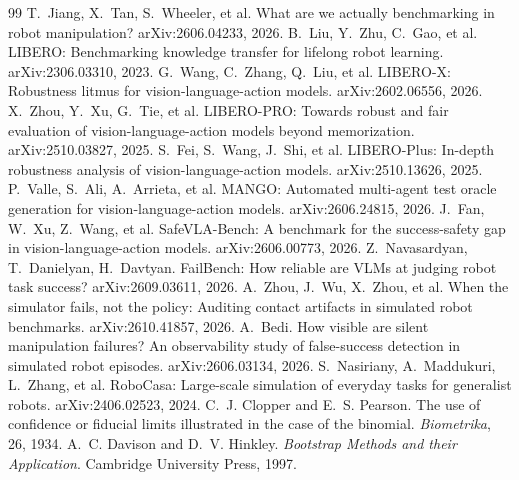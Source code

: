\documentclass[10pt,twocolumn]{article}
\begin{document}
\begin{thebibliography}{99}\small
{} T.~Jiang, X.~Tan, S.~Wheeler, et al. What are we actually benchmarking in robot manipulation? arXiv:2606.04233, 2026.
 B.~Liu, Y.~Zhu, C.~Gao, et al. LIBERO: Benchmarking knowledge transfer for lifelong robot learning. arXiv:2306.03310, 2023.
 G.~Wang, C.~Zhang, Q.~Liu, et al. LIBERO-X: Robustness litmus for vision-language-action models. arXiv:2602.06556, 2026.
 X.~Zhou, Y.~Xu, G.~Tie, et al. LIBERO-PRO: Towards robust and fair evaluation of vision-language-action models beyond memorization. arXiv:2510.03827, 2025.
 S.~Fei, S.~Wang, J.~Shi, et al. LIBERO-Plus: In-depth robustness analysis of vision-language-action models. arXiv:2510.13626, 2025.
 P.~Valle, S.~Ali, A.~Arrieta, et al. MANGO: Automated multi-agent test oracle generation for vision-language-action models. arXiv:2606.24815, 2026.
 J.~Fan, W.~Xu, Z.~Wang, et al. SafeVLA-Bench: A benchmark for the success-safety gap in vision-language-action models. arXiv:2606.00773, 2026.
 Z.~Navasardyan, T.~Danielyan, H.~Davtyan. FailBench: How reliable are VLMs at judging robot task success? arXiv:2609.03611, 2026.
 A.~Zhou, J.~Wu, X.~Zhou, et al. When the simulator fails, not the policy: Auditing contact artifacts in simulated robot benchmarks. arXiv:2610.41857, 2026.
 A.~Bedi. How visible are silent manipulation failures? An observability study of false-success detection in simulated robot episodes. arXiv:2606.03134, 2026.
 S.~Nasiriany, A.~Maddukuri, L.~Zhang, et al. RoboCasa: Large-scale simulation of everyday tasks for generalist robots. arXiv:2406.02523, 2024.
 C.~J. Clopper and E.~S. Pearson. The use of confidence or fiducial limits illustrated in the case of the binomial. \emph{Biometrika}, 26, 1934.
 A.~C. Davison and D.~V. Hinkley. \emph{Bootstrap Methods and their Application}. Cambridge University Press, 1997.
\end{thebibliography}
\end{document}
